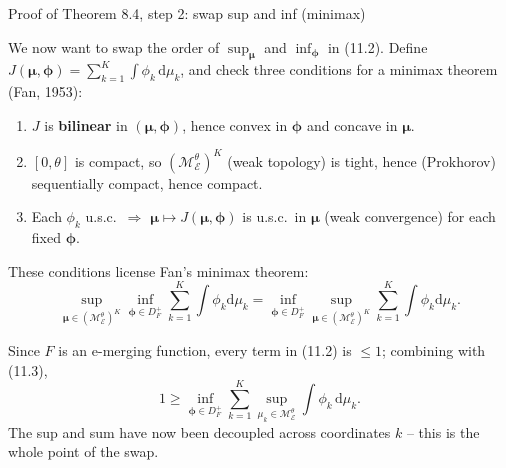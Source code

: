 \documentclass[aspectratio=169,10pt]{beamer}
\newcommand{\1}{\mathbb{1}}
\begin{document}
\begin{frame}[allowframebreaks]{Proof of Theorem 8.4, step 2: swap sup and inf (minimax)}

We now want to swap the order of $\sup_{\boldsymbol\mu}$ and $\inf_{\boldsymbol\phi}$ in (11.2). Define $J(\boldsymbol\mu,\boldsymbol\phi) = \sum_{k=1}^K \int \phi_k\,\mathrm{d}\mu_k$, and check three conditions for a minimax theorem (Fan, 1953):

\begin{enumerate}
\item[(i)] $J$ is \textbf{bilinear} in $(\boldsymbol\mu,\boldsymbol\phi)$, hence convex in $\boldsymbol\phi$ and concave in $\boldsymbol\mu$.
\item[(ii)] $[0,\theta]$ is compact, so $(\mathcal M_{\mathcal E}^\theta)^K$ (weak topology) is tight, hence (Prokhorov) sequentially compact, hence compact.
\item[(iii)] Each $\phi_k$ u.s.c.\ $\Rightarrow$ $\boldsymbol\mu \mapsto J(\boldsymbol\mu,\boldsymbol\phi)$ is u.s.c.\ in $\boldsymbol\mu$ (weak convergence) for each fixed $\boldsymbol\phi$.
\end{enumerate}

These conditions license Fan's minimax theorem:
\[
\sup_{\boldsymbol\mu\in(\mathcal M_{\mathcal E}^\theta)^K} \inf_{\boldsymbol\phi\in D_F^+} \sum_{k=1}^K \int\phi_k\mathrm{d}\mu_k
= \inf_{\boldsymbol\phi\in D_F^+} \sup_{\boldsymbol\mu\in(\mathcal M_{\mathcal E}^\theta)^K} \sum_{k=1}^K \int\phi_k\mathrm{d}\mu_k.
\tag{11.3}
\]

Since $F$ is an e-merging function, every term in (11.2) is $\le 1$; combining with (11.3),
\[
1 \ge \inf_{\boldsymbol\phi\in D_F^+} \sum_{k=1}^K \sup_{\mu_k\in\mathcal M_{\mathcal E}^\theta} \int \phi_k\,\mathrm{d}\mu_k.
\tag{11.4}
\]
The sup and sum have now been decoupled across coordinates $k$ -- this is the whole point of the swap.

\end{frame}
\end{document}
